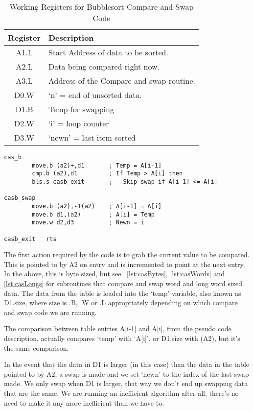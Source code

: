 \begin{table}[htbp]
\centering
\begin{tabular}{c p{}}
\toprule
\textbf{Register} &\textbf{Description}  \\
\midrule
%
A1.L & Start Address of data to be sorted.\\
A2.L & Data being compared right now.\\
A3.L & Address of the Compare and swap routine.\\
D0.W & `n' = end of unsorted data.\\
D1.B & Temp for swapping\\
D2.W & `i' = loop counter\\
D3.W & `newn' = last item sorted\\
%
\bottomrule
\end{tabular}
\caption{Working Registers for Bubblesort Compare and Swap Code}
\label{tab:BubblesortCompareAndSwapRegisters}
\end{table}

\begin{lstlisting}[firstnumber=last,caption={Bubblesort - Compare and Swap - Bytes},label={lst:casBytes}]
cas_b
        move.b (a2)+,d1       ; Temp = A[i-1]
        cmp.b (a2),d1         ; If Temp > A[i] then
        bls.s casb_exit       ;   Skip swap if A[i-1] <= A[i]

casb_swap
        move.b (a2),-1(a2)    ; A[i-1] = A[i]
        move.b d1,(a2)        ; A[i] = Temp
        move.w d2,d3          ; Newn = i

casb_exit   rts
\end{lstlisting}

The first action required by the code is to grab the current value to be compared. This is pointed to by A2 on entry and is incremented to point at the next entry. In the above, this is byte sized, but see \lstlistingname~\ref{lst:casBytes}, \ref{lst:casWords} and \ref{lst:casLongs} for subroutines that compare and swap word and long word sized data. The data from the table is loaded into the `temp' variable, also known as D1.size, where size is .B, .W or .L appropriately depending on which compare and swap code we are running.

The comparison between table entries A[i-1] and A[i], from the pseudo code description, actually compares `temp' with `A[i]', or D1.size with (A2), but it's the same comparison. 

In the event that the data in D1 is larger (in this case) than the data in the table pointed to by A2, a swap is made and we set `newn' to the index of the last swap made. We only swap when D1 is larger, that way we don't end up swapping data that are the same. We are running an inefficient algorithm after all, there's no need to make it any more inefficient than we have to.

